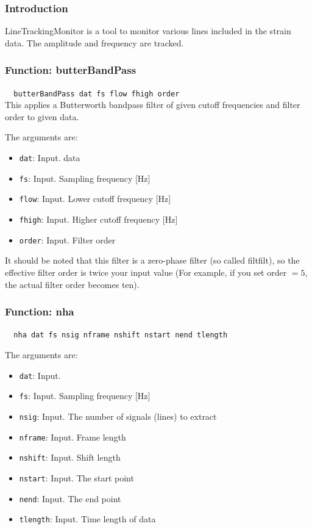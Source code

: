 \subsubsection{\bf Introduction}
LineTrackingMonitor is a tool to monitor various lines included in the strain data.
The amplitude and frequency are tracked.


\subsubsection{{\bf Function:} butterBandPass}
{\tt ~ butterBandPass dat fs flow fhigh order\\}
This applies a Butterworth bandpass filter of given cutoff frequencies and filter order to given data.

The arguments are:
\begin{itemize}
\item {\tt dat}: Input. data
\item {\tt fs}: Input. Sampling frequency [Hz]
\item {\tt flow}: Input. Lower cutoff frequency [Hz]
\item {\tt fhigh}: Input. Higher cutoff frequency [Hz]
\item {\tt order}: Input. Filter order
\end{itemize}

It should be noted that this filter is a zero-phase filter (so called filtfilt), so the effective filter order is twice your input value (For example, if you set order $= 5$, the actual filter order becomes ten).


\subsubsection{{\bf Function:} nha}
{\tt ~ nha dat fs nsig nframe nshift nstart nend tlength\\}


The arguments are:
\begin{itemize}
\item {\tt dat}: Input.
\item {\tt fs}: Input. Sampling frequency [Hz]
\item {\tt nsig}: Input. The number of signals (lines) to extract
\item {\tt nframe}: Input. Frame length
\item {\tt nshift}: Input. Shift length
\item {\tt nstart}: Input. The start point
\item {\tt nend}: Input. The end point
\item {\tt tlength}: Input. Time length of data
\end{itemize}


